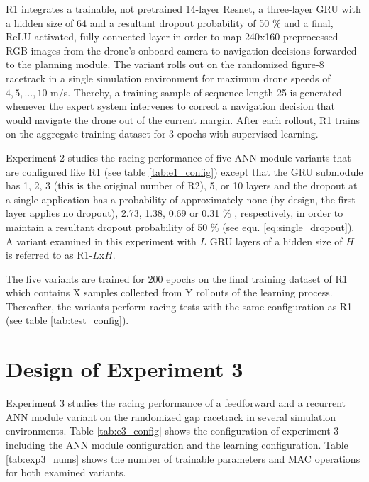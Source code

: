 R1 integrates
a trainable, not pretrained 14-layer Resnet, 
a three-layer GRU with a hidden size of 64
and a resultant dropout probability of 50 \%
and a final, ReLU-activated, fully-connected layer 
in order to map 240x160 preprocessed RGB images
from the drone's onboard camera
to navigation decisions forwarded to the planning module.
The variant rolls out on the randomized figure-8 racetrack
in a single simulation environment
for maximum drone speeds of $4,5,\dots,10$ m/s.
Thereby, a training sample of sequence length 25 
is generated whenever the expert system intervenes
to correct a navigation decision that would navigate
the drone out of the current margin.
After each rollout, R1 trains on
the aggregate training dataset 
for 3 epochs with supervised learning.



Experiment 2 studies the racing performance
of five ANN module variants
that are configured like R1
(see table \ref{tab:e1_config})
except that the GRU submodule has
1, 2, 3 (this is the original number of R2), 5, or 10 layers
and the dropout at a single application
has a probability of approximately
none (by design, the first layer applies no dropout), 
2.73, 1.38, 0.69 or 0.31 \%
, respectively,
in order to maintain
a resultant dropout probability of 50 \%
(see equ. \ref{eq:single_dropout}).
A variant examined in this experiment 
with $L$ GRU layers
of a hidden size of $H$
is referred to as R1-$L$x$H$.

The five variants are trained for
200 epochs on 
the final training dataset of R1
which contains X samples collected from Y rollouts
of the learning process.
Thereafter, the variants perform
racing tests with the same
configuration as R1 (see table \ref{tab:test_config}).





\section{Design of Experiment 3}
Experiment 3 studies the racing performance of a
feedforward and a recurrent ANN module variant
on the randomized gap racetrack in several
simulation environments.
Table \ref{tab:e3_config} shows the configuration of experiment 3
including the ANN module configuration
and the learning configuration.
Table \ref{tab:exp3_nums} shows the number of trainable parameters
and MAC operations for both examined variants.

